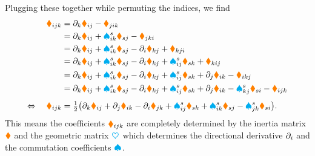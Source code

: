 Plugging these together while permuting the indices, we find
\begin{align}
 \textcolor{orange}{\blacklozenge}_{ijk} &= \partial_{k} \textcolor{orange}{\blacklozenge}_{ij} - \textcolor{orange}{\blacklozenge}_{jik} 
\nonumber\\
 &= \partial_{k} \textcolor{orange}{\blacklozenge}_{ij} + \textcolor{cyan}{\spadesuit}^{s}_{ik} \textcolor{orange}{\blacklozenge}_{sj} - \textcolor{orange}{\blacklozenge}_{jki} 
\nonumber\\
 &= \partial_{k} \textcolor{orange}{\blacklozenge}_{ij} + \textcolor{cyan}{\spadesuit}^{s}_{ik} \textcolor{orange}{\blacklozenge}_{sj} - \partial_{i} \textcolor{orange}{\blacklozenge}_{kj} + \textcolor{orange}{\blacklozenge}_{kji}
\nonumber\\
 &= \partial_{k} \textcolor{orange}{\blacklozenge}_{ij} + \textcolor{cyan}{\spadesuit}^{s}_{ik} \textcolor{orange}{\blacklozenge}_{sj} - \partial_{i} \textcolor{orange}{\blacklozenge}_{kj} + \textcolor{cyan}{\spadesuit}^{s}_{ij} \textcolor{orange}{\blacklozenge}_{sk} + \textcolor{orange}{\blacklozenge}_{kij}
\nonumber\\
 &= \partial_{k} \textcolor{orange}{\blacklozenge}_{ij} + \textcolor{cyan}{\spadesuit}^{s}_{ik} \textcolor{orange}{\blacklozenge}_{sj} - \partial_{i} \textcolor{orange}{\blacklozenge}_{kj} + \textcolor{cyan}{\spadesuit}^{s}_{ij} \textcolor{orange}{\blacklozenge}_{sk} + \partial_{j} \textcolor{orange}{\blacklozenge}_{ik} - \textcolor{orange}{\blacklozenge}_{ikj}
\nonumber\\
 &= \partial_{k} \textcolor{orange}{\blacklozenge}_{ij} + \textcolor{cyan}{\spadesuit}^{s}_{ik} \textcolor{orange}{\blacklozenge}_{sj} - \partial_{i} \textcolor{orange}{\blacklozenge}_{kj} + \textcolor{cyan}{\spadesuit}^{s}_{ij} \textcolor{orange}{\blacklozenge}_{sk} + \partial_{j} \textcolor{orange}{\blacklozenge}_{ik} - \textcolor{cyan}{\spadesuit}^{s}_{kj} \textcolor{orange}{\blacklozenge}_{si} - \textcolor{orange}{\blacklozenge}_{ijk}
\\[1ex]
 \Leftrightarrow \quad
 \textcolor{orange}{\blacklozenge}_{ijk} &= \tfrac{1}{2}\big( \partial_{k} \textcolor{orange}{\blacklozenge}_{ij} + \partial_{j} \textcolor{orange}{\blacklozenge}_{ik} - \partial_{i} \textcolor{orange}{\blacklozenge}_{jk} + \textcolor{cyan}{\spadesuit}^{s}_{ij} \textcolor{orange}{\blacklozenge}_{sk} + \textcolor{cyan}{\spadesuit}^{s}_{ik} \textcolor{orange}{\blacklozenge}_{sj} - \textcolor{cyan}{\spadesuit}^{s}_{jk} \textcolor{orange}{\blacklozenge}_{si} \big).
\label{eq:DefConnCoeffL}
\end{align}
This means the coefficients $\textcolor{orange}{\blacklozenge}_{ijk}$ are completely determined by the inertia matrix $\boldsymbol{\textcolor{orange}{\blacklozenge}}$ and the geometric matrix $\boldsymbol{\textcolor{cyan}{\heartsuit}}$ which determines the directional derivative $\partial_{i}$ and the commutation coefficients $\boldsymbol{\textcolor{cyan}{\spadesuit}}$.

